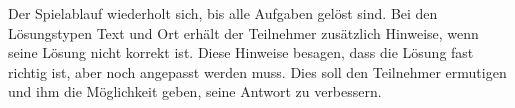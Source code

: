 Der Spielablauf wiederholt sich, bis alle Aufgaben gelöst sind. Bei den Lösungstypen Text und Ort erhält der Teilnehmer zusätzlich Hinweise, wenn seine Lösung nicht korrekt ist. Diese Hinweise besagen, dass die Lösung fast richtig ist, aber noch angepasst werden muss. Dies soll den Teilnehmer ermutigen und ihm die Möglichkeit geben, seine Antwort zu verbessern.




